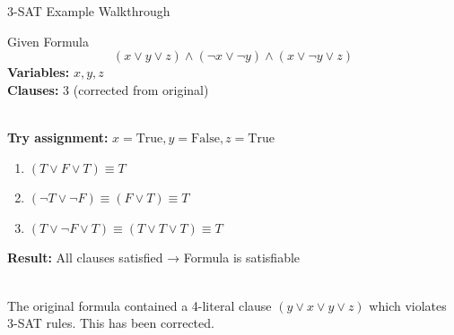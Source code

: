 \documentclass{beamer}
\begin{document}
\begin{frame}{3-SAT Example Walkthrough}
    \begin{exampleblock}{Given Formula}
        \[
        (x \lor y \lor z) \land (\neg x \lor \neg y) \land (x \lor \neg y \lor z)
        \]
        \textbf{Variables:} $x, y, z$ \\
        \textbf{Clauses:} 3 (corrected from original)
    \end{exampleblock}
    
    \textbf{\color{myred}{Verification Process:}} \\
        \textbf{Try assignment:} $x=\text{True}, y=\text{False}, z=\text{True}$
        
        \begin{enumerate}
            \item $(T \lor F \lor T) \equiv T$
            \item $(\neg T \lor \neg F) \equiv (F \lor T) \equiv T$
            \item $(T \lor \neg F \lor T) \equiv (T \lor T \lor T) \equiv T$
        \end{enumerate}
        
        \textbf{Result:} All clauses satisfied → Formula is satisfiable
    
    \textbf{\color{myred}{Note on Original Example:}} \\
        The original formula contained a 4-literal clause $(y \lor x \lor y \lor z)$ which violates 3-SAT rules. This has been corrected.
\end{frame}
\end{document}
